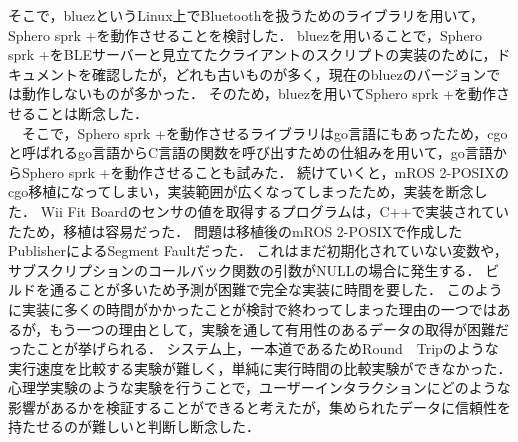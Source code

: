 そこで，bluezというLinux上でBluetoothを扱うためのライブラリを用いて，Sphero sprk +を動作させることを検討した．
bluezを用いることで，Sphero sprk +をBLEサーバーと見立てたクライアントのスクリプトの実装のために，ドキュメントを確認したが，どれも古いものが多く，現在のbluezのバージョンでは動作しないものが多かった．
そのため，bluezを用いてSphero sprk +を動作させることは断念した．
\\　そこで，Sphero sprk +を動作させるライブラリはgo言語にもあったため，cgoと呼ばれるgo言語からC言語の関数を呼び出すための仕組みを用いて，go言語からSphero sprk +を動作させることも試みた．
続けていくと，mROS 2-POSIXのcgo移植になってしまい，実装範囲が広くなってしまったため，実装を断念した．
Wii Fit Boardのセンサの値を取得するプログラムは，C++で実装されていたため，移植は容易だった．
問題は移植後のmROS 2-POSIXで作成したPublisherによるSegment Faultだった．
これはまだ初期化されていない変数や，サブスクリプションのコールバック関数の引数がNULLの場合に発生する．
ビルドを通ることが多いため予測が困難で完全な実装に時間を要した．
このように実装に多くの時間がかかったことが検討で終わってしまった理由の一つではあるが，もう一つの理由として，実験を通して有用性のあるデータの取得が困難だったことが挙げられる．
システム上，一本道であるためRound　Tripのような実行速度を比較する実験が難しく，単純に実行時間の比較実験ができなかった．
心理学実験のような実験を行うことで，ユーザーインタラクションにどのような影響があるかを検証することができると考えたが，集められたデータに信頼性を持たせるのが難しいと判断し断念した．
